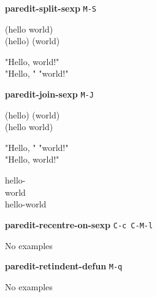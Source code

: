 \documentclass[10pt,landscape,a4paper]{article}
\begin{document}
\begin{multicols}{4}
\textbf{paredit-split-sexp} \texttt{M-S}

{\ttfamily
(hello\cursor{} world)\\
(hello)\cursor{} (world)

"Hello, \cursor world!"\\
"Hello, "\cursor{} "world!"
}

\textbf{paredit-join-sexp} \texttt{M-J}

{\ttfamily
(hello)\cursor{} (world)\\
(hello\cursor{} world)

"Hello, "\cursor{} "world!"\\
"Hello, \cursor world!"

hello-\\
\cursor \space \space world\\
hello-\cursor world
}

\textbf{paredit-recentre-on-sexp} \texttt{C-c C-M-l}

{\ttfamily
No examples
}

\textbf{paredit-retindent-defun} \texttt{M-q}

{\ttfamily
No examples
}

  \end{multicols}
\end{document}
